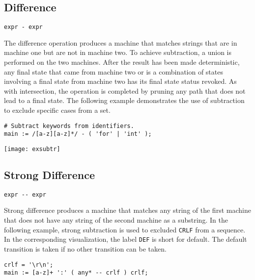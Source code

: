 \documentclass[letterpaper,11pt,oneside]{book}
\newcommand{\verbspace}{\vspace{10pt}}
\newcommand{\graphspace}{\vspace{10pt}}
\newenvironment{inline_code}{\def\baselinestretch{1}\vspace{12pt}\small}{}
\begin{document}
\subsection{Difference}

\verb|expr - expr|
\verbspace

The difference operation produces a machine that matches
strings that are in machine one but are not in machine two. To achieve subtraction,
a union is performed on the two machines. After the result has been made
deterministic, any final state that came from machine two or is a combination
of states involving a final state from machine two has its final state status
revoked. As with intersection, the operation is completed by pruning any path
that does not lead to a final state.  The following example demonstrates the
use of subtraction to exclude specific cases from a set.

\verbspace

% GENERATE: exsubtr
\begin{inline_code}
\begin{verbatim}
# Subtract keywords from identifiers.
main := /[a-z][a-z]*/ - ( 'for' | 'int' );
\end{verbatim}
\end{inline_code}

\graphspace
\begin{center}
\texttt{[image: exsubtr]}
\end{center}
\graphspace


\subsection{Strong Difference}
\label{strong_difference}

\verb|expr -- expr|
\verbspace

Strong difference produces a machine that matches any string of the first
machine that does not have any string of the second machine as a substring. In
the following example, strong subtraction is used to excluded \verb|CRLF| from
a sequence. In the corresponding visualization, the label \verb|DEF| is short
for default. The default transition is taken if no other transition can be
taken.

\begin{inline_code}
\begin{verbatim}
crlf = '\r\n';
main := [a-z]+ ':' ( any* -- crlf ) crlf;
\end{verbatim}
\end{inline_code}
\end{document}
